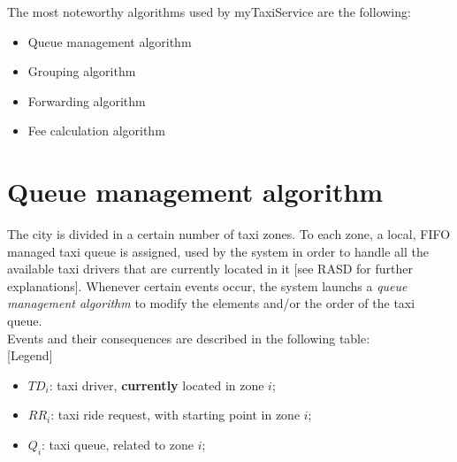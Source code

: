 The most noteworthy algorithms used by myTaxiService are the following:

\begin{itemize}
	\item Queue management algorithm
	\item Grouping algorithm
	\item Forwarding algorithm
	\item Fee calculation algorithm
\end{itemize}
	
\section{Queue management algorithm}
	The city is divided in a certain number of taxi zones. To each zone, a local, FIFO managed taxi queue is assigned, used by the system in order to handle all the available taxi drivers that are currently located in it [see RASD for further explanations]. Whenever certain events occur, the system launchs a \textit{queue management algorithm} to modify the elements and/or the order of the taxi queue.\\
	Events and their consequences are described in the following table:\\
	
	[Legend]
	\begin{itemize}
		\item $TD_i$: taxi driver, \textbf{currently} located in zone $i$;
		\item $RR_i$: taxi ride request, with starting point in zone $i$;
		\item $Q_i$: taxi queue, related to zone $i$;
	\end{itemize}
	
